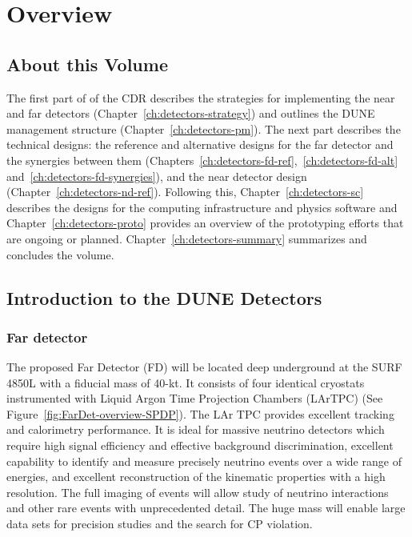 \chapter{Overview}
\label{ch:detectors-overview}




\section{About this Volume}

The first part of \voldune of the CDR describes the strategies for implementing the near and far detectors (Chapter~\ref{ch:detectors-strategy}) and outlines the DUNE management structure 
(Chapter~\ref{ch:detectors-pm}). The next part describes the technical designs: the reference and alternative designs for the far detector and the synergies between them (Chapters~\ref{ch:detectors-fd-ref},~\ref{ch:detectors-fd-alt} and~\ref{ch:detectors-fd-synergies}), and the near detector design (Chapter~\ref{ch:detectors-nd-ref}).  Following this, Chapter~\ref{ch:detectors-sc} describes the designs for the computing infrastructure and physics software and Chapter~\ref{ch:detectors-proto} provides an 
overview of the prototyping efforts that are ongoing or planned. Chapter~\ref{ch:detectors-summary} 
summarizes and concludes the volume.
 

\section{Introduction to the DUNE Detectors}
\label{sec:intro-dune-det}

\subsection{Far detector}
\label{sec:intro-dune-far-det}

The proposed Far Detector (FD) will be located deep underground at the
SURF 4850L with a fiducial mass of 40-kt. It consists of four
identical cryostats instrumented with Liquid Argon Time Projection
Chambers (LArTPC) (See Figure~\ref{fig:FarDet-overview-SPDP}). The LAr
TPC provides excellent tracking and calorimetry performance. It is
ideal for massive neutrino detectors which require high signal
efficiency and effective background discrimination, excellent
capability to identify and measure precisely neutrino events over a
wide range of energies, and excellent reconstruction of the kinematic
properties with a high resolution. The full imaging of events will
allow study of neutrino interactions and other rare events with
unprecedented detail. The huge mass will enable large data sets for
precision studies and the search for CP violation.

